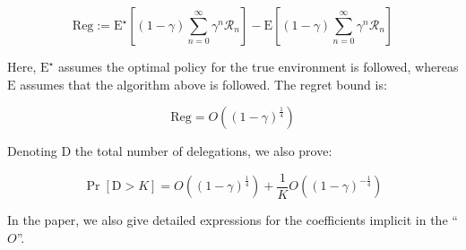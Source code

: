 \documentclass[a0paper,portrait]{baposter}
\begin{document}
\begin{poster}
{$$\mathrm{Reg}:=\mathrm{E}^\star\left[(1-\gamma)\sum_{n=0}^\infty {\gamma^n \mathcal{R}_n}\right]-\mathrm{E}\left[(1-\gamma)\sum_{n=0}^\infty {\gamma^n \mathcal{R}_n}\right]$$

Here, $\mathrm{E}^\star$ assumes the optimal policy for the true environment is followed, whereas $\mathrm{E}$ assumes that the algorithm above is followed. The regret bound is:

$$\mathrm{Reg}=O\left((1-\gamma)^{\frac{1}{4}}\right)$$

Denoting $\mathrm{D}$ the total number of delegations, we also prove:

$$\Pr\left[\mathrm{D}>K\right]=O\left((1-\gamma)^{\frac{1}{4}}\right)+\frac{1}{K}O\left((1-\gamma)^{-\frac{1}{4}}\right)$$

In the paper, we also give detailed expressions for the coefficients implicit in the \enquote{$O$}.
}

\end{poster}
\end{document}

